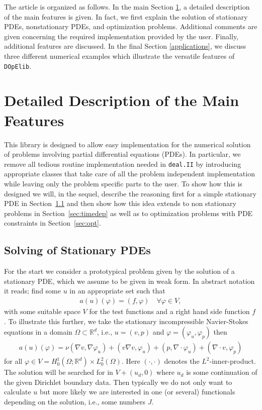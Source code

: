 \documentclass[smallextended]{svjour3}       %
\numberwithin{equation}{section}
\newcommand{\R}{\mathbb{R}}
\renewcommand{\phi}{\varphi}
\newcommand{\deal}{\texttt{deal.II}}
\newcommand{\dope}{\texttt{DOpElib}}
\begin{document}
The article is organized as follows. In the main Section
\ref{detailed_description}, a detailed description of 
the main features is given. In fact, we first explain the solution 
of stationary PDEs, nonstationary PDEs, and optimization problems. 
Additional comments are given concerning the required implementation 
provided by the user.
Finally, additional features are discussed. In the final Section
\ref{applications}, we discuss three different numerical 
examples which illustrate the versatile features of \dope{}. 



\section{Detailed Description of the Main Features}
\label{detailed_description}
This library is designed to allow easy implementation for the numerical solution 
of problems involving partial differential equations (PDEs). 
In particular, we remove all tedious routine implementation needed in 
\deal{} by introducing appropriate classes that take care of all the 
problem independent implementation while leaving only the problem specific 
parts to the user. To show how this is designed we will, in the sequel, 
describe the reasoning first for a simple stationary PDE in 
Section~\ref{subsubsec:stationary problems} and then show
how this idea extends to non stationary problems in 
Section~\ref{sec:timedep} as well as to optimization
problems with PDE constraints in Section~\ref{sec:opt}. 

\subsection{Solving of Stationary PDEs}
\label{subsubsec:stationary problems}
For the start we consider a prototypical problem given by the solution of 
a stationary PDE, which we assume to be given in weak form.
In abstract notation it reads; find some $u$ in an appropriate set
such that
\begin{align}\label{eq:prototype_weak}
a(u)(\phi) = (f,\phi) \quad \forall \phi \in V,
\end{align}
with some suitable space $V$ for the test functions and a 
right hand side function $f$.
To illustrate this further, we take the stationary 
incompressible Navier-Stokes equations in a domain $\Omega \subset \R^d$, 
i.e., $u = (v,p)$ and $\phi = (\phi_u,\phi_p)$ then
\begin{align}\label{eq:ns}
a(u)(\phi) = \nu(\nabla v, \nabla\phi_u) + (v \nabla v,\phi_u) + (p, \nabla \cdot \phi_u) + (\nabla \cdot v ,\phi_p)
\end{align}
for all $\phi \in V = H^1_0(\Omega;\R^d) \times L^2_0(\Omega)$.
Here $(\cdot,\cdot)$ denotes the $L^2$-inner-product.
The solution will be searched for in $V + (u_d,0)$ where $u_d$ is some 
continuation of the given Dirichlet boundary data.
Then typically we do not only want to calculate $u$ but more likely we are 
interested in one (or several) functionals depending on the solution, i.e., some numbers $J$.
\end{document}
